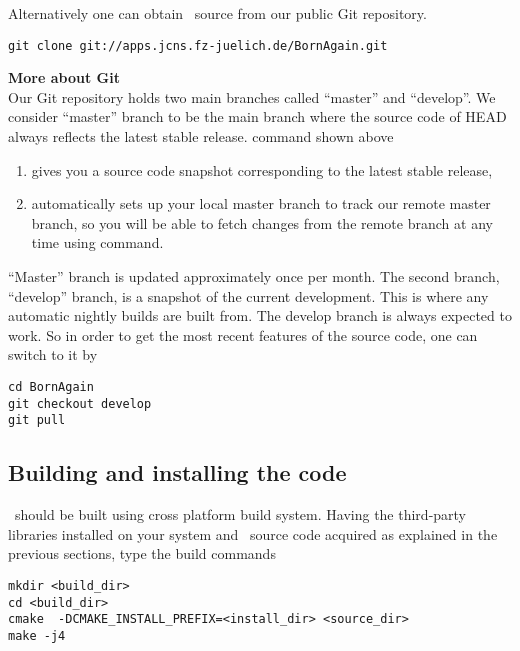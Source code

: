 \noindent
Alternatively one can obtain \BornAgain\ source from our public Git repository.
\begin{lstlisting}[language=shell, style=commandline]
git clone git://apps.jcns.fz-juelich.de/BornAgain.git 
\end{lstlisting}
\vspace*{3mm}


\noindent
{\bf\large More about Git} \\
Our Git repository holds two main branches called ``master'' and ``develop''. We consider ``master''
branch to be the main branch where the source code of HEAD always
reflects the latest stable release.  command shown above
\begin{enumerate}[1.]
\item gives you a source code snapshot corresponding to the latest stable release,
\item automatically sets up your local master branch to track our remote master branch, 
so you will be able to fetch changes from the remote branch at any time using  command.
\end{enumerate}

``Master'' branch is updated approximately once per month.
The second branch, ``develop'' branch, is a snapshot of the current development.
This is where any automatic nightly builds are built from. The develop branch is
always expected to work. So in order to get the most recent features
of the source code, one can switch to it by
\begin{lstlisting}[language=shell, style=commandline]
cd BornAgain
git checkout develop
git pull
\end{lstlisting}
\vspace*{3mm}



\subsection{Building and installing the code}

\BornAgain\ should be built using  cross platform build system. 
Having the third-party libraries installed on your system and
\BornAgain\ source code acquired as explained in the
previous sections, type the build commands
\begin{lstlisting}[language=shell, style=commandline]
mkdir <build_dir>
cd <build_dir>
cmake  -DCMAKE_INSTALL_PREFIX=<install_dir> <source_dir>
make -j4
\end{lstlisting}
\vspace*{3mm}

